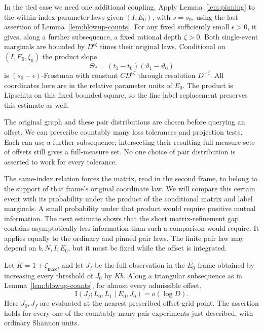 In the tied case we need one additional coupling. Apply
Lemma~\ref{lem:pinning} to the within-index parameter laws given
$(I,E_0)$, with $s=s_0$, using the last assertion of
Lemma~\ref{lem:blowup-counts}. For any fixed sufficiently small
$\epsilon>0$, it gives, along a further subsequence, a fixed
rational depth $\zeta>0$. Both single-event marginals are bounded
by $D^{\epsilon\zeta}$ times their original laws. Conditional on
$(I,E_0,\xi_0)$ the product slope
\begin{equation}
 \Theta_*=(t_1-t_0)(\vartheta_1-\vartheta_0)
\label{pr:product-slope}
\end{equation}
is $(s_0-\epsilon)$-Frostman with constant
$CD^{\epsilon\zeta}$ through resolution $D^{-\zeta}$.
All coordinates here are in the relative parameter units of
$E_0$. The product is Lipschitz on this fixed bounded square, so
the fine-label replacement preserves this estimate as well.

The original graph and these pair distributions are chosen before
querying an offset. We can prescribe countably many loss
tolerances and projection tests. Each can use a further subsequence;
intersecting their resulting full-measure sets of offsets still
gives a full-measure set. No one choice of pair distribution is
asserted to work for every tolerance.

The same-index relation forces the matrix, read in the second frame,
to belong to the support of that frame's original coordinate law. We
will compare this certain event with its probability under the product
of the conditional matrix and label marginals. A small probability
under that product would require positive mutual information. The
next estimate shows that the short matrix-refinement gap contains
asymptotically less information than such a comparison would require.
It applies equally to the ordinary and pinned pair laws. The finite
pair law may depend on $b,N,I,E_0$, but it must be fixed while the offset
is integrated.

\begin{lemma}
\label{lem:pair-information}
Let $K=1+\zeta_{\max}$, and let $J_f$ be the full observation in
the $E_0$-frame obtained by increasing every threshold of $J_0$
by $Kb$. Along a triangular subsequence as in
Lemma~\ref{lem:blowup-counts}, for almost every admissible offset,
\begin{equation}
 \mathrm I(J_f;L_0,L_1\mid E_0,J_0)=o(\log D).
\label{pr:pair-information}
\end{equation}
Here $J_0,J_f$ are evaluated at the nearest prescribed offset-grid
point. The assertion holds for every one of the countably many
pair experiments just described, with ordinary Shannon units.
\end{lemma}

